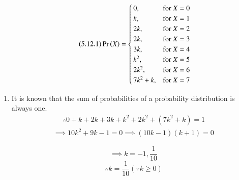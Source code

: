 \begin{align}
 \tag{5.12.1}
 \Pr\left(X\right) = 
  \begin{cases}
    0, & \text{for }  X = 0 \\
    k, & \text{for }  X = 1 \\
    2k, & \text{for } X = 2 \\
    2k, & \text{for } X = 3 \\
    3k, & \text{for } X = 4 \\
    k^2, & \text{for } X = 5 \\
    2k^2, & \text{for } X = 6 \\
    7k^2 + k, & \text{for } X = 7 \\
    \end{cases}
  \end{align}
\begin{enumerate}
    \item It is known that the sum of probabilities of a probability distribution is always one. 
\begin{align}
\tag{5.12.2}
    \therefore 0 + k + 2k + 3k + k^2 + 2k^2 + (7k^2 + k) = 1 
\end{align}
\begin{align}
\tag{5.12.3}
\implies 10k^2 + 9k - 1 = 0 
 \implies  (10k - 1)(k + 1) = 0
 \end{align}
 
  \begin{equation}
  \tag{5.12.4}
 \implies  k = -1, \frac{1}{10} 
\end{equation}
\begin{equation}
    \tag{1}
 \therefore k = \frac{1}{10} (\because k \ge 0)
 \end{equation}
 


\end{enumerate}
